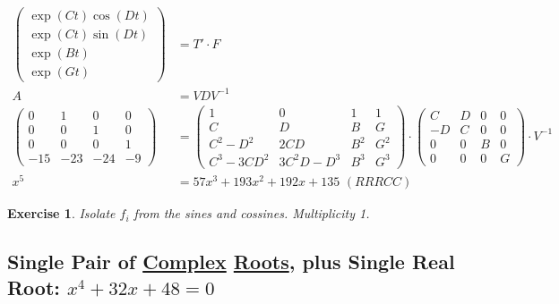 \documentclass[12pt,a4paper]{article}
\newtheorem{exercise}{Exercise}[section]
\begin{document}
\begin{align}
\begin{pmatrix} \exp (Ct) \cos (Dt) \\ \exp (Ct) \sin (Dt) \\ \exp (Bt)  \\ \exp (Gt) \end{pmatrix} &= T' \cdot F  \\
A &= VDV^{-1} \\
\left( \begin{matrix} 0 & 1 & 0 & 0 \\ 0 & 0 & 1 & 0 \\ 0 & 0 & 0 & 1 \\ -15 & -23 & -24 & -9 \end{matrix} \right)
&=
\left( \begin{matrix}  1 & 0 & 1 & 1 \\ C & D & B & G \\ C^2-D^2 & 2CD & B^2 & G^2 \\ C^3-3CD^2 & 3C^2D - D^3 & B^3 & G^3  \end{matrix} \right) \cdot
\left( \begin{matrix}  C & D & 0 & 0 \\ -D & C & 0 & 0 \\ 0 & 0 & B & 0 \\ 0 & 0 & 0 & G  \end{matrix} \right) \cdot V^{-1} \\
x^5 &= 57 x^3 + 193 x^2 + 192 x + 135\,\,(RRRCC)
\end{align}

\begin{exercise}
Isolate $f_i$ from the sines and cossines. Multiplicity 1.
\end{exercise}

\subsection{Single Pair of \href{}{Complex} \href{}{Roots}, plus Single Real Root: $x^4 + 32 x + 48 = 0$}
\end{document}
